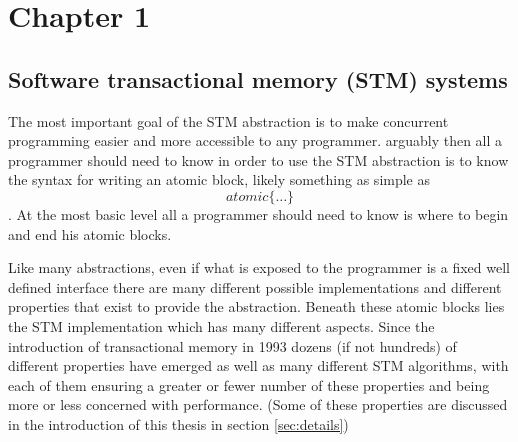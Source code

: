 \section{Chapter 1}
\subsection{Software transactional memory (STM) systems}
The most important goal of the STM abstraction is to make concurrent programming
easier and more accessible to any programmer.
arguably then all a programmer should need to know in order to use the STM abstraction is to know
the syntax for writing an atomic block, likely something as simple as
$$atomic \{ \dots \} $$.
At the most basic level all a programmer should need to know is where
to begin and end his atomic blocks.







Like many abstractions, even if what is exposed to the programmer is a fixed well
defined interface there are many different possible implementations and different
properties that exist to provide the abstraction.
Beneath these atomic blocks lies the STM implementation which has many different aspects.
Since the introduction of transactional memory in 1993 \cite{HM93} dozens (if not hundreds) of different properties have emerged
as well as many different STM algorithms,
with each of them ensuring a greater or fewer number of these properties and being more or less
concerned with performance.
(Some of these properties are discussed in the introduction of this thesis in section \ref{sec:details})

